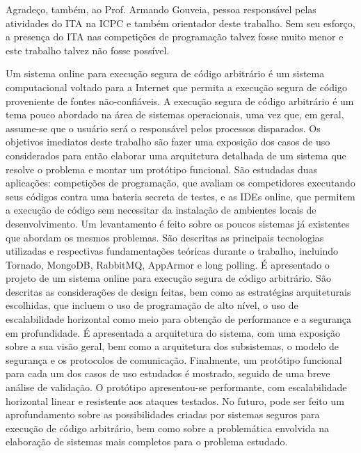 \documentclass[ruledheader, 12pt]{abnt}
\begin{document}
Agradeço, também, ao Prof. Armando Gouveia, pessoa responsável pelas atividades do ITA na ICPC e também orientador deste trabalho. Sem seu esforço, a presença do ITA nas competições de programação talvez fosse muito menor e este trabalho talvez não fosse possível.

\begin{resumo}
Um sistema online para execução segura de código arbitrário é um sistema computacional voltado para a Internet que permita a execução segura de código proveniente de fontes não-confiáveis. A execução segura de código arbitrário é um tema pouco abordado na área de sistemas operacionais, uma vez que, em geral, assume-se que o usuário será o responsável pelos processos disparados. Os objetivos imediatos deste trabalho são fazer uma exposição dos casos de uso considerados para então elaborar uma arquitetura detalhada de um sistema que resolve o problema e montar um protótipo funcional. São estudadas duas aplicações: competições de programação, que avaliam os competidores executando seus códigos contra uma bateria secreta de testes, e as IDEs online, que permitem a execução de código sem necessitar da instalação de ambientes locais de desenvolvimento. Um levantamento é feito sobre os poucos sistemas já existentes que abordam os mesmos problemas. São descritas as principais tecnologias utilizadas e respectivas fundamentações teóricas durante o trabalho, incluindo Tornado, MongoDB, RabbitMQ, AppArmor e long polling. É apresentado o projeto de um sistema online para execução segura de código arbitrário. São descritas as considerações de design feitas, bem como as estratégias arquiteturais escolhidas, que incluem o uso de programação de alto nível, o uso de escalabilidade horizontal como meio para obtenção de performance e a segurança em profundidade. É apresentada a arquitetura do sistema, com uma exposição sobre a sua visão geral, bem como a arquitetura dos subsistemas, o modelo de segurança e os protocolos de comunicação. Finalmente, um protótipo funcional para cada um dos casos de uso estudados é mostrado, seguido de uma breve análise de validação. O protótipo apresentou-se performante, com escalabilidade horizontal linear e resistente aos ataques testados. No futuro, pode ser feito um aprofundamento sobre as possibilidades criadas por sistemas seguros para execução de código arbitrário, bem como sobre a problemática envolvida na elaboração de sistemas mais completos para o problema estudado.
\end{resumo}
\end{document}
